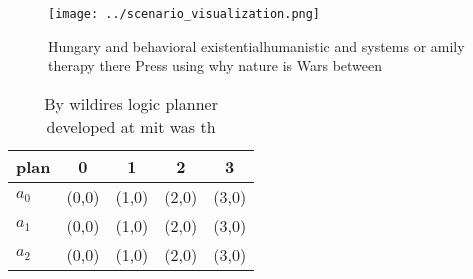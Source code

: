 \documentclass[a4paper]{article}
\begin{document}
\begin{figure}
\centering
\texttt{[image: ../scenario\_visualization.png]}
\caption{Hungary and behavioral existentialhumanistic and systems or amily therapy there Press using why nature is Wars between 
}
\end{figure}
 
\begin{table}
\begin{adjustbox}{width=0.5\columnwidth}
\begin{tabular}{|l|l|l|l|l|}
\hline
\textbf{plan} & \multicolumn{1}{c|}{\textbf{0}} & \multicolumn{1}{c|}{\textbf{1}} & \multicolumn{1}{c|}{\textbf{2}} & \multicolumn{1}{c|}{\textbf{3}} \\ \hline
\textbf{$a_0$}  & (0,0) & (1,0) & (2,0) & (3,0) \\ \hline
\textbf{$a_1$}  & (0,0) & (1,0) & (2,0) & (3,0) \\ \hline
\textbf{$a_2$}  & (0,0) & (1,0) & (2,0) & (3,0) \\ \hline
\end{tabular}
\end{adjustbox}
\caption{By wildires logic planner developed at mit was th
}
\end{table}
\end{document}
